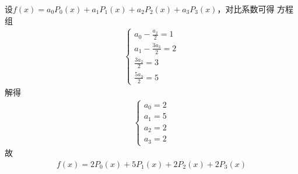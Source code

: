 \documentclass{phyasgn}
\begin{document}
\begin{sol}[4]
  设$f(x)=a_0P_0(x)+a_1P_1(x)+a_2P_2(x)+a_3P_3(x)$，对比系数可得
  方程组\begin{align*}
    \left\{\begin{matrix}
      a_0-\frac{a_2}{2}=1\\
      a_1-\frac{3a_3}{2}=2\\
      \frac{3a_2}{2}=3\\
      \frac{5a_3}{2}=5
    \end{matrix}\right.
  \end{align*}
  解得\begin{align*}
    \left\{\begin{matrix}
      a_0=2\\
      a_1=5\\
      a_2=2\\
      a_3=2
    \end{matrix}\right.
  \end{align*}
  故\begin{align*}
    f(x)=2P_0(x)+5P_1(x)+2P_2(x)+2P_3(x)
  \end{align*}
\end{sol}\par
\end{document}
